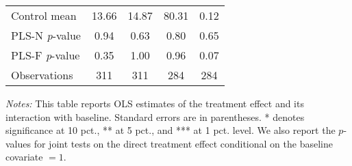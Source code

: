 \begin{table}[ht]
{\begin{threeparttable}
\begin{tabular}{l*{4}{c}}
Control mean    &    13.66         &    14.87         &    80.31         &     0.12         \\
PLS-N \emph{p}-value&     0.94         &     0.63         &     0.80         &     0.65         \\
PLS-F \emph{p}-value&     0.35         &     1.00         &     0.96         &     0.07         \\
Observations    &      311         &      311         &      284         &      284         \\
\bottomrule \end{tabular} \begin{tablenotes}[flushleft] \footnotesize \item \emph{Notes:} This table reports OLS estimates of the treatment effect and its interaction with baseline. Standard errors are in parentheses. * denotes significance at 10 pct., ** at 5 pct., and *** at 1 pct. level. We also report the \(p\)-values for joint tests on the direct treatment effect conditional on the baseline covariate $= 1$. \end{tablenotes} \end{threeparttable} } \end{table}

